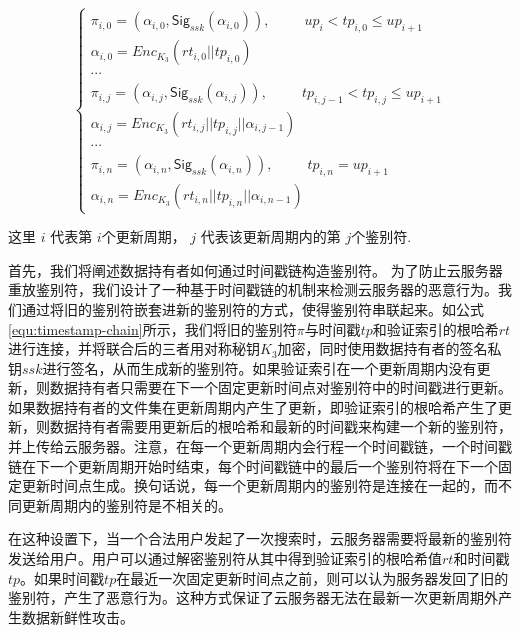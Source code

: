 \begin{equation}
  \label{equ:timestamp-chain}
    \left\{
    \begin{array}{ll} %
      \pi_{i, 0} = (\alpha_{i, 0}, \mathsf{Sig}_{ssk}(\alpha_{i, 0})),~~~~~~~~~~~up_i < tp_{i, 0} \leq up_{i+1} \\
      \alpha_{i, 0} = Enc_{K_3}(rt_{i, 0}||tp_{i, 0}) \\
      \cdots \\

     \pi_{i, j} = (\alpha_{i, j}, \mathsf{Sig}_{ssk}(\alpha_{i, j})),~~~~~~~~~~~tp_{i, j-1} < tp_{i, j} \leq up_{i+1}  \\
     \alpha_{i, j} = Enc_{K_3}(rt_{i, j}||tp_{i, j}||\alpha_{i, j-1}) \\
      \cdots  \\
     \pi_{i, n} = (\alpha_{i, n}, \mathsf{Sig}_{ssk}(\alpha_{i, n})),~~~~~~~~~~~tp_{i, n}=up_{i+1} \\
     \alpha_{i, n} = Enc_{K_3}(rt_{i, n}||tp_{i, n}||\alpha_{i, n-1})
    \end{array}
    \right.
  \end{equation}

\noindent 这里 $i$ 代表第 $i$个更新周期， $j$ 代表该更新周期内的第 $j$个鉴别符.

首先，我们将阐述数据持有者如何通过时间戳链构造鉴别符。
为了防止云服务器重放鉴别符，我们设计了一种基于时间戳链的机制来检测云服务器的恶意行为。我们通过将旧的鉴别符嵌套进新的鉴别符的方式，使得鉴别符串联起来。如公式\ref{equ:timestamp-chain}所示，我们将旧的鉴别符$\pi$与时间戳$tp$和验证索引的根哈希$rt$进行连接，并将联合后的三者用对称秘钥$K_3$加密，同时使用数据持有者的签名私钥$ssk$进行签名，从而生成新的鉴别符。如果验证索引在一个更新周期内没有更新，则数据持有者只需要在下一个固定更新时间点对鉴别符中的时间戳进行更新。如果数据持有者的文件集在更新周期内产生了更新，即验证索引的根哈希产生了更新，则数据持有者需要用更新后的根哈希和最新的时间戳来构建一个新的鉴别符，并上传给云服务器。注意，在每一个更新周期内会行程一个时间戳链，一个时间戳链在下一个更新周期开始时结束，每个时间戳链中的最后一个鉴别符将在下一个固定更新时间点生成。换句话说，每一个更新周期内的鉴别符是连接在一起的，而不同更新周期内的鉴别符是不相关的。

在这种设置下，当一个合法用户发起了一次搜索时，云服务器需要将最新的鉴别符发送给用户。用户可以通过解密鉴别符从其中得到验证索引的根哈希值$rt$和时间戳$tp$。如果时间戳$tp$在最近一次固定更新时间点之前，则可以认为服务器发回了旧的鉴别符，产生了恶意行为。这种方式保证了云服务器无法在最新一次更新周期外产生数据新鲜性攻击。

